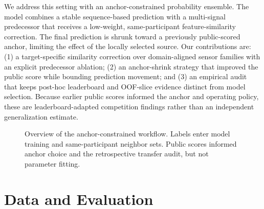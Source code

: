 \documentclass[conference]{IEEEtran}
\begin{document}
We address this setting with an anchor-constrained probability ensemble. The model combines a stable sequence-based prediction with a multi-signal predecessor that receives a low-weight, same-participant feature-similarity correction. The final prediction is shrunk toward a previously public-scored anchor, limiting the effect of the locally selected source. Our contributions are: (1) a target-specific similarity correction over domain-aligned sensor families with an explicit predecessor ablation; (2) an anchor-shrink strategy that improved the public score while bounding prediction movement; and (3) an empirical audit that keeps post-hoc leaderboard and OOF-slice evidence distinct from model selection. Because earlier public scores informed the anchor and operating policy, these are leaderboard-adapted competition findings rather than an independent generalization estimate.

\begin{figure}[t]
\centering
{}
\caption{Overview of the anchor-constrained workflow. Labels enter model training and same-participant neighbor sets. Public scores informed anchor choice and the retrospective transfer audit, but not parameter fitting.}
\label{fig:workflow}
\end{figure}

\section{Data and Evaluation}
\end{document}
